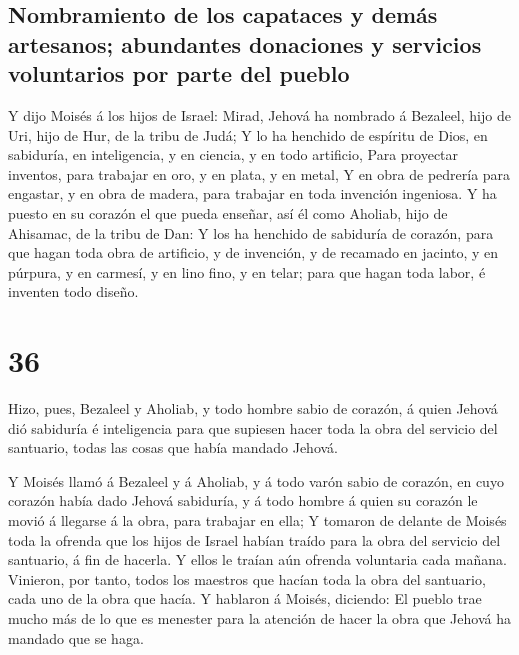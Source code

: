 \hypertarget{nombramiento-de-los-capataces-y-demuxe1s-artesanos-abundantes-donaciones-y-servicios-voluntarios-por-parte-del-pueblo}{%
\subsection{Nombramiento de los capataces y demás artesanos; abundantes
donaciones y servicios voluntarios por parte del
pueblo}\label{nombramiento-de-los-capataces-y-demuxe1s-artesanos-abundantes-donaciones-y-servicios-voluntarios-por-parte-del-pueblo}}

 Y dijo Moisés á los hijos de Israel: Mirad, Jehová ha
nombrado á Bezaleel, hijo de Uri, hijo de Hur, de la tribu de Judá;
 Y lo ha henchido de espíritu de Dios, en sabiduría, en
inteligencia, y en ciencia, y en todo artificio,  Para
proyectar inventos, para trabajar en oro, y en plata, y en metal,
 Y en obra de pedrería para engastar, y en obra de madera,
para trabajar en toda invención ingeniosa.  Y ha puesto en
su corazón el que pueda enseñar, así él como Aholiab, hijo de Ahisamac,
de la tribu de Dan:  Y los ha henchido de sabiduría de
corazón, para que hagan toda obra de artificio, y de invención, y de
recamado en jacinto, y en púrpura, y en carmesí, y en lino fino, y en
telar; para que hagan toda labor, é inventen todo diseño.

\hypertarget{section-35}{%
\section{36}\label{section-35}}

 Hizo, pues, Bezaleel y Aholiab, y todo hombre sabio de
corazón, á quien Jehová dió sabiduría é inteligencia para que supiesen
hacer toda la obra del servicio del santuario, todas las cosas que había
mandado Jehová.

 Y Moisés llamó á Bezaleel y á Aholiab, y á todo varón sabio
de corazón, en cuyo corazón había dado Jehová sabiduría, y á todo hombre
á quien su corazón le movió á llegarse á la obra, para trabajar en ella;
 Y tomaron de delante de Moisés toda la ofrenda que los
hijos de Israel habían traído para la obra del servicio del santuario, á
fin de hacerla. Y ellos le traían aún ofrenda voluntaria cada mañana.
 Vinieron, por tanto, todos los maestros que hacían toda la
obra del santuario, cada uno de la obra que hacía.  Y
hablaron á Moisés, diciendo: El pueblo trae mucho más de lo que es
menester para la atención de hacer la obra que Jehová ha mandado que se
haga.

